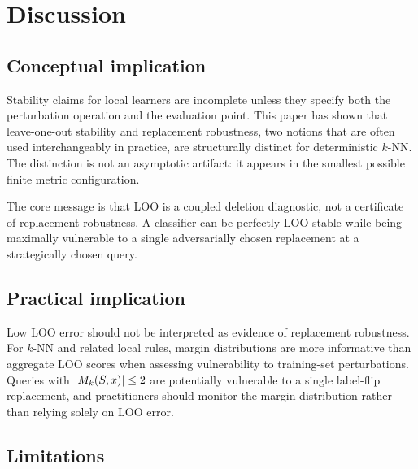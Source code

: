 \section{Discussion}
\label{sec:discussion}

\subsection{Conceptual implication}

Stability claims for local learners are incomplete unless they specify both the
perturbation operation and the evaluation point.  This paper has shown that
leave-one-out stability and replacement robustness, two notions that are often
used interchangeably in practice, are structurally distinct for deterministic
$k$-NN.  The distinction is not an asymptotic artifact: it appears in the
smallest possible finite metric configuration.

The core message is that LOO is a coupled deletion diagnostic, not a
certificate of replacement robustness.  A classifier can be perfectly
LOO-stable while being maximally vulnerable to a single adversarially chosen
replacement at a strategically chosen query.

\subsection{Practical implication}

Low LOO error should not be interpreted as evidence of replacement robustness.
For $k$-NN and related local rules, margin distributions are more informative
than aggregate LOO scores when assessing vulnerability to training-set
perturbations.  Queries with $|M_k(S,x)| \le 2$ are potentially vulnerable to
a single label-flip replacement, and practitioners should monitor the margin
distribution rather than relying solely on LOO error.

\subsection{Limitations}

